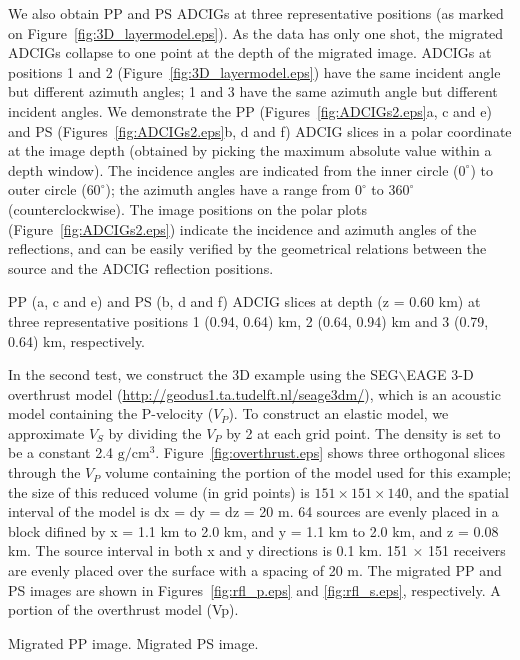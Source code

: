 \documentclass[manuscript,ulem,graphix,revised]{geophysics}
\begin{document}
We also obtain PP and PS ADCIGs at three representative positions (as marked on Figure~\ref{fig:3D_layermodel.eps}).  As the data has only one shot, the migrated ADCIGs collapse to one point at the depth of the migrated image. ADCIGs at positions 1 and 2 (Figure~\ref{fig:3D_layermodel.eps}) have the same incident angle but different azimuth angles; 1 and 3 have the same azimuth angle but different incident angles.  We demonstrate the PP (Figures~\ref{fig:ADCIGs2.eps}a, c and e) and PS (Figures~\ref{fig:ADCIGs2.eps}b, d and f) ADCIG slices in a polar coordinate at the image depth (obtained by picking the maximum absolute value within a depth window). The incidence angles are indicated from the inner circle ($0^{\circ}$) to outer circle ($60^{\circ}$); the azimuth angles have a range from $0^{\circ}$ to $360^{\circ}$ (counterclockwise). The image positions on the polar plots (Figure~\ref{fig:ADCIGs2.eps}) indicate the incidence and azimuth angles of the reflections, and can be easily verified by the geometrical relations between the source and the ADCIG reflection positions.


{
PP (a, c and e) and PS (b, d and f) ADCIG slices at depth (z = 0.60 km) at three representative positions 1 (0.94, 0.64) km, 2 (0.64, 0.94) km and 3 (0.79, 0.64) km,  respectively.
}

In the second test, we construct the 3D example using the SEG$\backslash$EAGE 3-D overthrust model (\url{http://geodus1.ta.tudelft.nl/seage3dm/}), which is an acoustic model containing the P-velocity ($V_{P}$). To construct an elastic model, we approximate $V_{S}$ by dividing the $V_{P}$ by 2 at each grid point.  The density is set to be a constant 2.4 $\mathrm{g/cm^3}$. Figure~\ref{fig:overthrust.eps} shows three orthogonal slices through the $V_{P}$ volume containing the portion of the model used for this example; the size of this reduced volume (in grid points) is $151\times 151 \times 140$, and the spatial interval of the model is dx = dy = dz = 20 m. 64 sources are evenly placed in a block difined by x = 1.1 km to 2.0 km, and y = 1.1 km to 2.0 km, and z = 0.08 km. The source interval in both x and y directions is 0.1 km. 151 $\times$ 151 receivers are evenly placed over the surface with a spacing of 20 m.
The migrated PP and PS images are shown in Figures~\ref{fig:rfl_p.eps} and \ref{fig:rfl_s.eps}, respectively.
{
A portion of the overthrust model (Vp).
}

{
Migrated PP image.
}
{
Migrated PS image.
}
\end{document}
